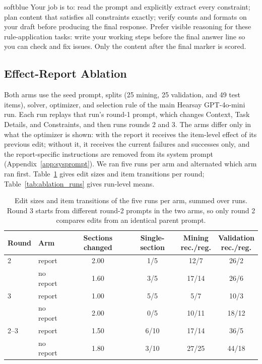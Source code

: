 \documentclass[10pt]{article} %
\begin{document}
\begin{promptbox}[title={\textbf{IFBench: returned Task Details} (round 1 excerpt)},fontupper=\small]{softblue}
Your job is to: read the prompt and explicitly extract every constraint; plan content that satisfies all constraints
exactly; verify counts and formats on your draft before producing the final response. Prefer visible reasoning for these rule-application
tasks: write your working steps before the final answer line so you can check and fix issues. Only the content after the final marker is
scored.
\end{promptbox}

\FloatBarrier
\subsection{Effect-Report Ablation}
\label{app:ablation}
Both arms use the seed prompt, splits (25 mining, 25 validation, and 49 test items), solver, optimizer, and selection
rule of the main Hearsay GPT-4o-mini run. Each run replays that run's round-1 prompt, which changes Context, Task
Details, and Constraints, and then runs rounds 2 and 3. The arms differ only in what the optimizer is shown: with the
report it receives the item-level effect of its previous edit; without it, it receives the current failures and
successes only, and the report-specific instructions are removed from its system prompt (Appendix~\ref{app:sysprompt}).
We ran five runs per arm and alternated which arm ran first. Table~\ref{tab:ablation_rounds} gives edit sizes and item
transitions per round; Table~\ref{tab:ablation_runs} gives run-level means.

\begin{table}[htbp]
\caption{Edit sizes and item transitions of the five runs per arm, summed over runs. Round 3 starts from different
round-2 prompts in the two arms, so only round 2 compares edits from an identical parent prompt.}
\label{tab:ablation_rounds}
\begin{center}
\small
\setlength{\tabcolsep}{4pt}
\begin{tabular}{llcccc}
\toprule
\rowcolor{midblue}Round & Arm & Sections changed & Single-section & \shortstack{Mining\\rec./reg.} & \shortstack{Validation\\rec./reg.} \\
\midrule
2 & report & 2.00 & 1/5 & 12/7 & 26/2 \\
 & no report & 1.60 & 3/5 & 17/14 & 26/6 \\
\midrule
3 & report & 1.00 & 5/5 & 5/7 & 10/3 \\
 & no report & 2.00 & 0/5 & 10/11 & 18/12 \\
\midrule
2--3 & report & 1.50 & 6/10 & 17/14 & 36/5 \\
 & no report & 1.80 & 3/10 & 27/25 & 44/18 \\
\bottomrule
\end{tabular}
\end{center}
\end{table}
\end{document}
